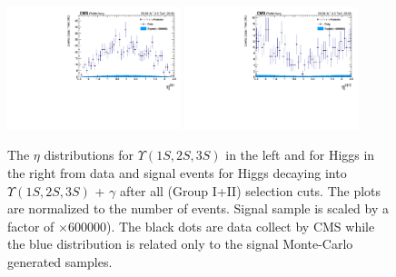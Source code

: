 \begin{figure}[!htbp]
\begin{center}
\includegraphics[width=0.45\textwidth]{figures_and_tables/outputPlots/HtoUpsilon_Cat0_ZZZZZ/nEvts/data_x_mc/withKinCuts/h_withKin_Upsilon_eta}\hspace*{1.cm}
\includegraphics[width=0.45\textwidth]{figures_and_tables/outputPlots/HtoUpsilon_Cat0_ZZZZZ/nEvts/data_x_mc/withKinCuts/h_withKin_Z_eta}
\end{center}\vspace*{-.5cm}
\caption{The $\eta$ distributions for $\Upsilon(1S,2S,3S)$ in the left and for Higgs in the right from data and signal events for Higgs decaying into $\Upsilon(1S,2S,3S)$ + $\gamma$ after all (Group I+II) selection cuts. The plots are normalized to the number of events. Signal sample is scaled by a factor of $\times 600000$). The black dots are data collect by CMS while the blue distribution is related only to the signal Monte-Carlo generated samples.}
\label{fig:etaUpsilon_and_Higgs_HtoUpsilon_Cat0_groupI_plus_II}
\end{figure}

